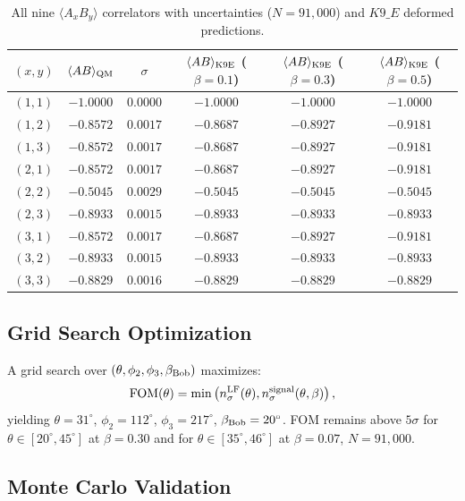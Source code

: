 \documentclass[12pt]{article}
\begin{document}
\begin{table}[h]
\centering
\caption{All nine $\langle A_x B_y\rangle$ correlators with uncertainties ($N = 91{,}000$) and $K9\_E$ deformed predictions.}
\begin{tabular}{cccccc}
\toprule
$(x,y)$ & $\langle AB\rangle_{\rm QM}$ & $\sigma$ & $\langle AB\rangle_{\rm K9E}$ ($\beta=0.1$) & $\langle AB\rangle_{\rm K9E}$ ($\beta=0.3$) & $\langle AB\rangle_{\rm K9E}$ ($\beta=0.5$) \\
\midrule
$(1,1)$ & $-1.0000$ & $0.0000$ & $-1.0000$ & $-1.0000$ & $-1.0000$ \\
$(1,2)$ & $-0.8572$ & $0.0017$ & $-0.8687$ & $-0.8927$ & $-0.9181$ \\
$(1,3)$ & $-0.8572$ & $0.0017$ & $-0.8687$ & $-0.8927$ & $-0.9181$ \\
$(2,1)$ & $-0.8572$ & $0.0017$ & $-0.8687$ & $-0.8927$ & $-0.9181$ \\
$(2,2)$ & $-0.5045$ & $0.0029$ & $-0.5045$ & $-0.5045$ & $-0.5045$ \\
$(2,3)$ & $-0.8933$ & $0.0015$ & $-0.8933$ & $-0.8933$ & $-0.8933$ \\
$(3,1)$ & $-0.8572$ & $0.0017$ & $-0.8687$ & $-0.8927$ & $-0.9181$ \\
$(3,2)$ & $-0.8933$ & $0.0015$ & $-0.8933$ & $-0.8933$ & $-0.8933$ \\
$(3,3)$ & $-0.8829$ & $0.0016$ & $-0.8829$ & $-0.8829$ & $-0.8829$ \\
\bottomrule
\end{tabular}
\end{table}

\subsection{Grid Search Optimization}

A grid search over $(\theta, \phi_2, \phi_3, \beta_{\rm Bob})$ maximizes:
\begin{equation}
\text{FOM}(\theta) = \min\left( n_\sigma^{\rm LF}(\theta), n_\sigma^{\rm signal}(\theta, \beta) \right),
\end{equation}
yielding $\theta = 31^\circ$, $\phi_2 = 112^\circ$, $\phi_3 = 217^\circ$, $\beta_{\rm Bob} = 20^\circ$. FOM remains above $5\sigma$ for $\theta \in [20^\circ, 45^\circ]$ at $\beta = 0.30$ and for $\theta \in [35^\circ, 46^\circ]$ at $\beta = 0.07$, $N = 91{,}000$.

\subsection{Monte Carlo Validation}
\end{document}
